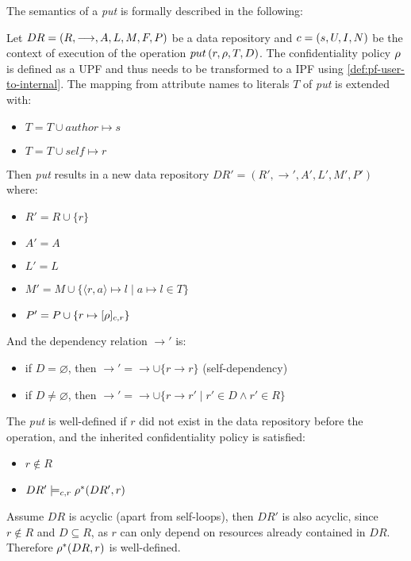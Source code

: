 The semantics of a \emph{put} is formally described in the following:
\begin{definition}
Let $DR= \left( R, \longrightarrow, A, L, M, F, P \right)$ be a data repository and $c = \left( s, U, I, N \right)$ be the context of execution of the operation $put \left( r, \rho, T, D \right)$. The confidentiality policy $\rho$ is defined as a UPF and thus needs to be transformed to a IPF using \autoref{def:pf-user-to-internal}. The mapping from attribute names to literals $T$ of \emph{put} is extended with: 
\begin{itemize}
    \item $T = T \cup author \mapsto s$
    \item $T = T \cup self \mapsto r$
\end{itemize}
Then \emph{put} results in a new data repository $DR'=\left(R', \longrightarrow', A', L', M', P' \right)$ where:
\begin{itemize}
    \item $R' = R \cup \{r\}$
    \item $A' = A$
    \item $L' = L$
    \item $M' = M \cup \{ \langle r,a \rangle \mapsto l \mid a \mapsto l \in T \}$
    \item $P' = P \cup \{ r \mapsto [\rho]_{c,r} \}$
\end{itemize}
And the dependency relation $\longrightarrow'$ is:
\begin{itemize}
    \item if $D = \varnothing$, then $\longrightarrow' = \longrightarrow \cup \{r \longrightarrow r\}$ (self-dependency)
    \item if $D \neq \varnothing$, then $\longrightarrow' = \longrightarrow \cup \{r \longrightarrow r' \mid r' \in D \land r' \in R \}$
\end{itemize}
The \emph{put} is well-defined if $r$ did not exist in the data repository before the operation, and the inherited confidentiality policy is satisfied:
\begin{itemize}
    \item $r \not\in R$
    \item $DR' \models_{c,r} \rho^{\ast}(DR',r)$
\end{itemize}
Assume $DR$ is acyclic (apart from self-loops), then $DR'$ is also acyclic, since $r \notin R$ and $D \subseteq R$, as $r$ can only depend on resources already contained in $DR$. Therefore $\rho^{\ast}(DR,r)$ is well-defined.
\end{definition}

